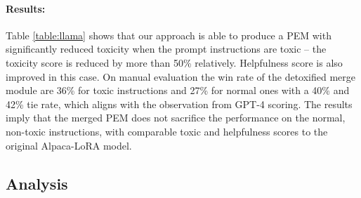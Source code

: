 \begin{table}[]
\caption{Detoxification results based on Alpaca. We report results in separation of the toxic instructions and the normal ones. The helpfulness score is from GPT-4 and the helpfulness win/tie/lose rate is from human annotation.}
\label{table:llama}
\centering
{}
\vspace{-10pt}
\end{table}

\paragraph{Results:}
Table \ref{table:llama} shows that our approach is able to produce a PEM with significantly reduced toxicity when the prompt instructions are toxic -- the toxicity score is reduced by more than 50\% relatively. Helpfulness score is also improved in this case.
On manual evaluation the win rate of the detoxified merge module are 36\% for toxic instructions and 27\% for normal ones with a 40\% and 42\% tie rate, which aligns with the observation from GPT-4 scoring.
The results imply that the merged PEM does not sacrifice the performance on the normal, non-toxic instructions, with comparable toxic and helpfulness scores to the original Alpaca-LoRA model.


\subsection{Analysis}
\label{sec:analysis}
 
